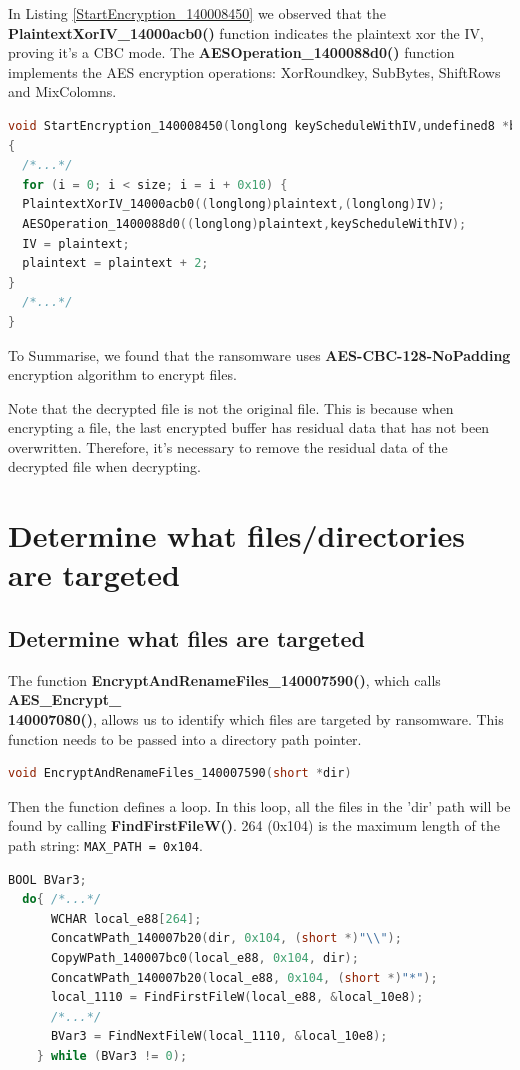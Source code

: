 \documentclass[11pt]{article}
\begin{document}
In Listing \ref{StartEncryption_140008450} we observed that the \textbf{PlaintextXorIV\_14000acb0()} function indicates the plaintext xor the IV, proving it's a CBC mode. The \textbf{AESOperation\_1400088d0()} function implements the AES encryption operations: XorRoundkey, SubBytes, ShiftRows and MixColomns.

\begin{lstlisting}[language=c++, caption=Part of StartEncryption\_140008450, label=StartEncryption_140008450]
void StartEncryption_140008450(longlong keyScheduleWithIV,undefined8 *buffer,uint size)
{
  /*...*/
  for (i = 0; i < size; i = i + 0x10) {
  PlaintextXorIV_14000acb0((longlong)plaintext,(longlong)IV);
  AESOperation_1400088d0((longlong)plaintext,keyScheduleWithIV);
  IV = plaintext;
  plaintext = plaintext + 2;
}
  /*...*/
}
\end{lstlisting}

To Summarise, we found that the ransomware uses \textbf{AES-CBC-128-NoPadding} encryption algorithm to encrypt files.

Note that the decrypted file is not the original file. This is because when encrypting a file, the last encrypted buffer has residual data that has not been overwritten. Therefore, it's necessary to remove the residual data of the decrypted file when decrypting.

\section{Determine what files/directories are targeted}
\subsection{Determine what files are targeted}
The function \textbf{EncryptAndRenameFiles\_140007590()}, which calls \textbf{AES\_Encrypt\_\\140007080()}, allows us to identify which files are targeted by ransomware. This function needs to be passed into a directory path pointer.
\begin{lstlisting}[language=c++]
void EncryptAndRenameFiles_140007590(short *dir)
\end{lstlisting}

Then the function defines a loop. In this loop, all the files in the 'dir' path will be found by calling \textbf{FindFirstFileW()}. 264 (0x104) is the maximum length of the path string: \lstinline|MAX_PATH = 0x104|.
\begin{lstlisting}[language=c++]
  BOOL BVar3;
  do{ /*...*/
      WCHAR local_e88[264];
      ConcatWPath_140007b20(dir, 0x104, (short *)"\\");
      CopyWPath_140007bc0(local_e88, 0x104, dir);
      ConcatWPath_140007b20(local_e88, 0x104, (short *)"*");
      local_1110 = FindFirstFileW(local_e88, &local_10e8);
      /*...*/
      BVar3 = FindNextFileW(local_1110, &local_10e8);
    } while (BVar3 != 0);
\end{lstlisting}
\end{document}
